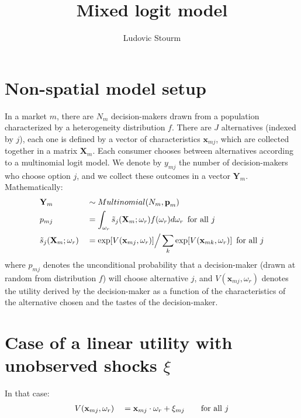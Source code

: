 \documentclass[12pt]{article}
\title{Mixed logit model}
\author{Ludovic Stourm}
\begin{document}
\maketitle

\section{Non-spatial model setup}
In a market $m$, there are $N_m$ decision-makers drawn from a population characterized by a heterogeneity distribution $f$. There are $J$ alternatives (indexed by $j$), each one is defined by a vector of characteristics $\textbf{x}_{mj}$, which are collected together in a matrix $\textbf{X}_m$. Each consumer chooses between alternatives according to a multinomial logit model. We denote by $y_{mj}$ the number of decision-makers who choose option $j$, and we collect these outcomes in a vector $\textbf{Y}_m$. Mathematically:
\begin{equation}
\begin{aligned}
	& \textbf{Y}_m && \sim Multinomial(N_m, \textbf{p}_m) \\
	& p_{mj} && = \int_{\omega_r} \tilde{s}_{j}(\textbf{X}_m; \omega_r) f(\omega_r) d \omega_r   \hspace*{5pt} \text{for all } j \\
	& \tilde{s}_{j}(\textbf{X}_m; \omega_r)  && =  \exp[V(\textbf{x}_{mj}, \omega_r)] \Big/ \sum_k \exp[V(\textbf{x}_{mk}, \omega_r)] \hspace*{5pt} \text{for all } j
\end{aligned}
\end{equation}
where $p_{mj}$ denotes the unconditional probability that a decision-maker (drawn at random from distribution $f$) will choose alternative $j$, and $V(\textbf{x}_{mj}, \omega_r)$ denotes the utility derived by the decision-maker as a function of the characteristics of the alternative chosen and the tastes of the decision-maker.


\section{Case of a linear utility with unobserved shocks $\xi$}
In that case:
\begin{equation}
\begin{aligned}
	& V(\textbf{x}_{mj}, \omega_r) && = \textbf{x}_{mj} \cdot \omega_r + \xi_{mj} \hspace*{20pt} \text{for all } j \\
\end{aligned}
\end{equation}
\end{document}
